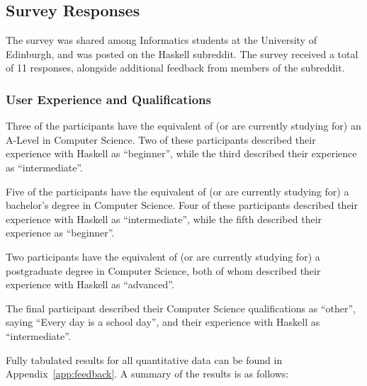 \documentclass[../main.tex]{subfiles}
\begin{document}
        \subsection{Survey Responses}
            The survey was shared among Informatics students at the University of
                Edinburgh, and was posted on the Haskell subreddit.
            The survey received a total of 11 responses, alongside additional feedback from
                members of the subreddit.

            \subsubsection{User Experience and Qualifications}
                Three of the participants have the equivalent of (or are currently studying
                    for) an A-Level in Computer Science.
                Two of these participants described their experience with Haskell as
                    ``beginner'', while the third described their experience as ``intermediate''.

                Five of the participants have the equivalent of (or are currently studying for)
                    a bachelor's degree in Computer Science.
                Four of these participants described their experience with Haskell as
                    ``intermediate'', while the fifth described their experience as ``beginner''.

                Two participants have the equivalent of (or are currently studying for) a
                    postgraduate degree in Computer Science, both of whom described their
                    experience with Haskell as ``advanced''.

                The final participant described their Computer Science qualifications as
                    ``other'', saying ``Every day is a school day'', and their experience with
                    Haskell as ``intermediate''.

                Fully tabulated results for all quantitative data can be found in
                    Appendix~\ref{app:feedback}.
                A summary of the results is as follows:
\end{document}
